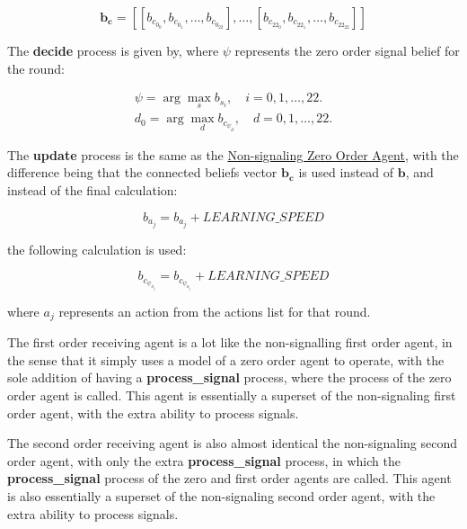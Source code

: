\[
\mathbf{b_c} = [[b_{c_{0_{0}}}, b_{c_{0_{1}}}, \ldots, b_{c_{0_{22}}}], \ldots, [b_{c_{22_{0}}}, b_{c_{22_{1}}}, \ldots, b_{c_{22_{22}}}]]
\]

The \textbf{decide} process is given by, where $\psi$ represents the zero order signal belief for the round:

\begin{equation*}
\begin{aligned}
    \psi = \arg\max_s b_{s_i}, \quad i = 0, 1, \ldots, 22. \\
    d_0 = \arg\max_d b_{c_{{\psi}_d}}, \quad d = 0, 1, \ldots, 22.
\end{aligned}
\end{equation*}

The \textbf{update} process is the same as the \hyperref[eq:zero-order-update]{Non-signaling Zero Order Agent}, with the difference being that the connected beliefs vector $\mathbf{b_c}$ is used instead of $\mathbf{b}$, and instead of the final calculation:

\[
    b_{a_j} = b_{a_j} + LEARNING\_SPEED 
\]

the following calculation is used:

\begin{equation*}
    b_{c_{\psi_{a_j}}} = b_{c_{\psi_{a_j}}} + LEARNING\_SPEED
\end{equation*}

where $a_j$ represents an action from the actions list for that round.


The first order receiving agent is a lot like the non-signalling first order agent, in the sense that it simply uses a model of a zero order agent to operate, with the sole addition of having a \textbf{process\_signal} process, where the  process of the zero order agent is called. This agent is essentially a superset of the non-signaling first order agent, with the extra ability to process signals.


The second order receiving agent is also almost identical the non-signaling second order agent, with only the extra \textbf{process\_signal} process, in which the \textbf{process\_signal} process of the zero and first order agents are called. This agent is also essentially a superset of the non-signaling second order agent, with the extra ability to process signals.

